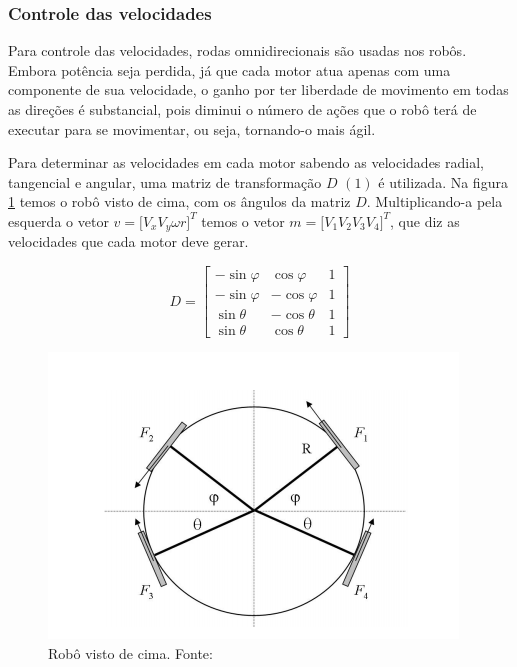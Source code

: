 \documentclass[conference]{IEEEtran}
\begin{document}
\subsubsection{Controle das velocidades}

Para  controle das velocidades, rodas omnidirecionais são usadas nos robôs. Embora potência seja perdida, já que cada motor atua apenas com uma componente de sua velocidade, o ganho por ter liberdade de movimento em todas as direções é substancial, pois diminui o número de ações que o robô terá de executar para se movimentar, ou seja, tornando-o mais ágil.

Para determinar as velocidades em cada motor sabendo as velocidades radial, tangencial e angular, uma matriz de transformação $D$ $(1)$ é utilizada. Na figura \ref{img:omni} temos o robô visto de cima, com os ângulos da matriz $D$. Multiplicando-a pela esquerda o vetor $v = [V_x$\hspace{0.25cm}$V_y$\hspace{0.25cm}$\omega r]^T$ temos o vetor $m = [V_1$\hspace{0.25cm}$V_2$\hspace{0.25cm}$V_3$\hspace{0.25cm}$V_4]^T$, que diz as velocidades que cada motor deve gerar.


\begin{equation}
    D = \begin{bmatrix}
        -\sin\varphi & \cos\varphi & 1 \\
        -\sin\varphi & -\cos\varphi & 1 \\
        \sin\theta & -\cos\theta & 1\\
        \sin\theta & \cos\theta &1
    \end{bmatrix}
\end{equation}

\begin{figure}[thpb]	
	\centering
	\includegraphics[width=\linewidth]{img/omni}
	\caption{Robô visto de cima. Fonte: \cite{omni}}
	\label{img:omni}
\end{figure}
\end{document}
